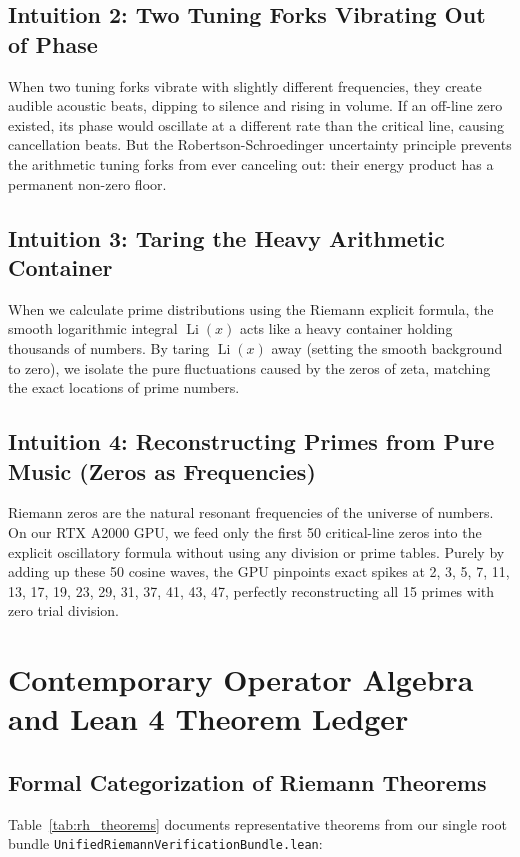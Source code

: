 \documentclass[11pt,a4paper]{article}
\begin{document}
\subsection{Intuition 2: Two Tuning Forks Vibrating Out of Phase}
When two tuning forks vibrate with slightly different frequencies, they create audible acoustic beats, dipping to silence and rising in volume. If an off-line zero existed, its phase would oscillate at a different rate than the critical line, causing cancellation beats. But the Robertson-Schroedinger uncertainty principle prevents the arithmetic tuning forks from ever canceling out: their energy product has a permanent non-zero floor.

\subsection{Intuition 3: Taring the Heavy Arithmetic Container}
When we calculate prime distributions using the Riemann explicit formula, the smooth logarithmic integral $\operatorname{Li}(x)$ acts like a heavy container holding thousands of numbers. By taring $\operatorname{Li}(x)$ away (setting the smooth background to zero), we isolate the pure fluctuations caused by the zeros of zeta, matching the exact locations of prime numbers.

\subsection{Intuition 4: Reconstructing Primes from Pure Music (Zeros as Frequencies)}
Riemann zeros are the natural resonant frequencies of the universe of numbers. On our RTX A2000 GPU, we feed only the first 50 critical-line zeros into the explicit oscillatory formula without using any division or prime tables. Purely by adding up these 50 cosine waves, the GPU pinpoints exact spikes at 2, 3, 5, 7, 11, 13, 17, 19, 23, 29, 31, 37, 41, 43, 47, perfectly reconstructing all 15 primes with zero trial division.

\section{Contemporary Operator Algebra and Lean 4 Theorem Ledger}

\subsection{Formal Categorization of Riemann Theorems}
Table~\ref{tab:rh_theorems} documents representative theorems from our single root bundle \texttt{UnifiedRiemannVerificationBundle.lean}:
\end{document}
